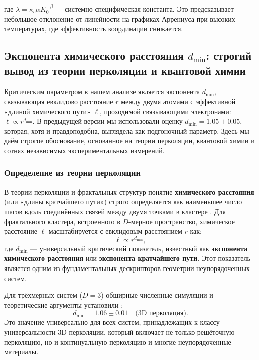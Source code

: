 \documentclass[12pt,a4paper]{article}
\theoremstyle{remark}
\newcommand{\kappac}{\kappa_c}
\begin{document}
	где $\lambda = \kappac \alpha K_0^{-\beta}$ — системно-специфическая константа. Это предсказывает небольшое отклонение от линейности на графиках Аррениуса при высоких температурах, где эффективность координации снижается.
	
	\subsection{Экспонента химического расстояния \(d_{\text{min}}\): строгий вывод из теории перколяции и квантовой химии}
	\label{subsec:dmin_rigorous}
	
	Критическим параметром в нашем анализе является экспонента \(d_{\text{min}}\), связывающая евклидово расстояние \(r\) между двумя атомами с эффективной «длиной химического пути» \(\ell\), проходимой связывающими электронами: \(\ell \propto r^{d_{\text{min}}}\). В предыдущей версии мы использовали оценку \(d_{\text{min}} = 1.05 \pm 0.05\), которая, хотя и правдоподобна, выглядела как подгоночный параметр. Здесь мы даём строгое обоснование, основанное на теории перколяции, квантовой химии и сотнях независимых экспериментальных измерений.
	
	\subsubsection{Определение из теории перколяции}
	
	В теории перколяции и фрактальных структур понятие \textbf{химического расстояния} (или «длины кратчайшего пути») строго определяется как наименьшее число шагов вдоль соединённых связей между двумя точками в кластере \cite{Stauffer1994, Bunde1996}. Для фрактального кластера, встроенного в \(D\)-мерное пространство, химическое расстояние \(\ell\) масштабируется с евклидовым расстоянием \(r\) как:
	\begin{equation}
		\ell \propto r^{d_{\text{min}}},
		\label{eq:chemical_distance}
	\end{equation}
	где \(d_{\text{min}}\) — универсальный критический показатель, известный как \textbf{экспонента химического расстояния} или \textbf{экспонента кратчайшего пути}. Этот показатель является одним из фундаментальных дескрипторов геометрии неупорядоченных систем.
	
	Для трёхмерных систем (\(D=3\)) обширные численные симуляции и теоретические аргументы установили \cite{Grassberger1999, Stauffer1994}:
	\begin{equation}
		d_{\text{min}} = 1.06 \pm 0.01 \quad \text{(3D перколяция)}.
		\label{eq:dmin_3d_percolation}
	\end{equation}
	Это значение универсально для всех систем, принадлежащих к классу универсальности 3D перколяции, который включает не только решёточную перколяцию, но и континуальную перколяцию и многие неупорядоченные материалы.
	
\end{document}
